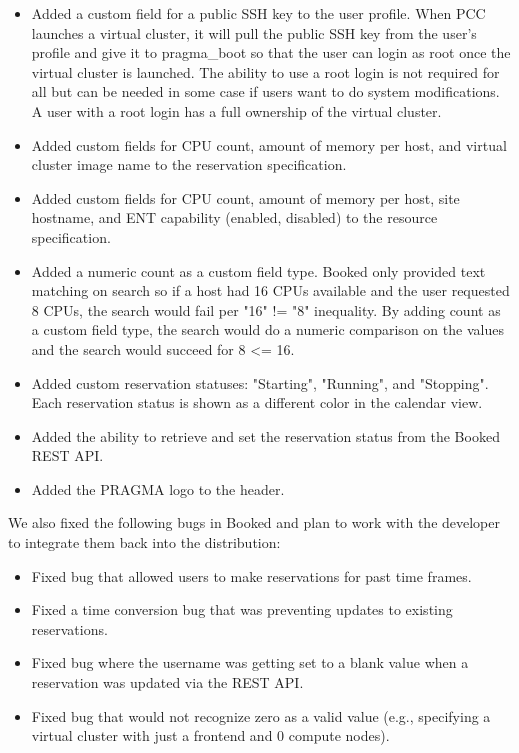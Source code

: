 \documentclass{acm_proc_article-sp}
\begin{document}
\begin{itemize}
\item Added a custom field for a public SSH key  to the user profile.  When PCC launches a virtual cluster, it will pull the public SSH key from the user's  profile and give it to pragma\_boot so that the user can login as root once the virtual cluster is launched.   The ability to use a root login is not required for all but can be needed in some case if users want to do system modifications. A user with a root login has a full ownership of the virtual cluster. 
\item Added custom fields for CPU count, amount of memory per host, and virtual cluster image name to the reservation specification.
\item Added custom fields for CPU count, amount of memory per host, site hostname, and ENT capability (enabled, disabled) to the resource specification.
\item Added a numeric count as a custom field type.  Booked only provided text matching on search so if a host had 16 CPUs available and the user requested 8 CPUs, the search would fail per "16" != "8" inequality.  By adding count as a custom field type, the search would do a numeric comparison on the values and the search would succeed for 8 <= 16.
\item Added custom reservation statuses: "Starting", "Running", and "Stopping".  Each reservation status is shown as a different color in  the calendar view.
\item Added the ability to retrieve and set the reservation status from the Booked REST API.  	
\item Added the PRAGMA logo to the header.
\end{itemize}

We also fixed the following bugs in Booked and plan to work with the developer to integrate them back into the distribution:

\begin{itemize}
\item Fixed bug that allowed users to make reservations for past time frames.
\item Fixed a time conversion bug that was preventing updates to existing reservations.
\item Fixed bug where the username was getting set to a blank value when a reservation was updated via the REST API. 
\item Fixed bug that would not recognize zero as a valid value (e.g., specifying a virtual cluster with just a frontend and 0 compute nodes).  
\end{itemize}
\end{document}
